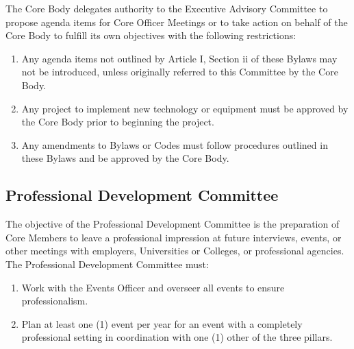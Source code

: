 \documentclass{article}
\newenvironment{li}{
\begin{enumerate}
  \setlength{\itemsep}{1pt}
  \setlength{\parskip}{0pt}
  \setlength{\parsep}{0pt}
}{\end{enumerate}}
\begin{document}
\noindent The Core Body delegates authority to the Executive Advisory Committee to propose agenda items for Core Officer Meetings or to take action on behalf of the Core Body to fulfill its own objectives with the following restrictions:
\begin{li}
\item Any agenda items not outlined by Article I, Section ii of these Bylaws may not be introduced, unless originally referred to this Committee by the Core Body.
\item Any project to implement new technology or equipment must be approved by the Core Body prior to beginning the project.
\item Any amendments to Bylaws or Codes must follow procedures outlined in these Bylaws and be approved by the Core Body.
\end{li}

 \subsection{Professional Development Committee}
 The objective of the Professional Development Committee is the preparation of Core Members to leave a professional impression at future interviews, events, or other meetings with employers, Universities or Colleges, or professional agencies. The Professional Development Committee must:
 \begin{li}
 \item Work with the Events Officer and overseer all events to ensure professionalism.
 \item Plan at least one (1) event per year for an event with a completely professional setting in coordination with one (1) other of the three pillars.
 \end{li}
 


\end{document}

